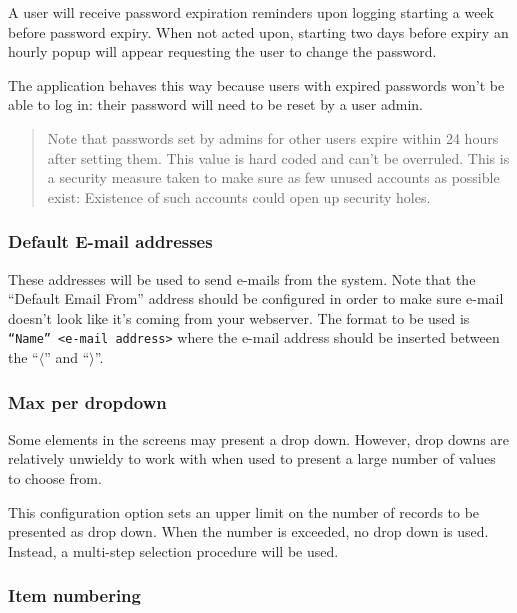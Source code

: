 A user will receive password expiration reminders upon logging starting a week before password
expiry. When not acted upon, starting two days before expiry an hourly popup will appear
requesting the user to change the password.

The application behaves this way because users with expired passwords won't be able to log in:
their password will need to be reset by a user admin.

\begin{quotation}
Note that passwords set by admins for other users expire within 24 hours after setting them.
This value is hard coded and can't be overruled. This is a security measure taken to make
sure as few unused accounts as possible exist: Existence of such accounts could open up security
holes.
\end{quotation}


\subsubsection{Default E-mail addresses}
\label{subsubsec-company-config-defaults-email}

These addresses will be used to send e-mails from the system.
Note that the ``Default Email From'' address should be configured in order to make sure
e-mail doesn't look like it's coming from your webserver. The format to be used is \texttt{``Name'' <e-mail address>} where the e-mail address should be inserted between the
``$\langle$'' and ``$\rangle$''.

\subsubsection{Max per dropdown}
\label{subsubsec-company-config-defaults-max-dropdown}

Some elements in the screens may present a drop down. However, drop downs are
relatively unwieldy to work with when used to present a large number of values
to choose from.

This configuration option sets an upper limit on the number of records to be
presented as drop down.  When the number is exceeded, no drop down is used.  Instead,
a multi-step selection procedure will be used.

\subsubsection{Item numbering}
\label{subsubsec-company-config-defaults-item-numbers}

